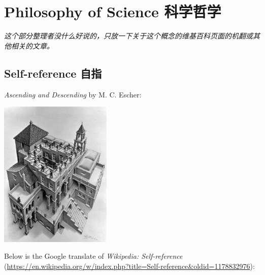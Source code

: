 \chapter{Philosophy of Science
科学哲学}\label{philosophy-of-science-ux79d1ux5b66ux54f2ux5b66}

\emph{这个部分整理者没什么好说的，只放一下关于这个概念的维基百科页面的机翻或其他相关的文章。}

\section{Self-reference 自指}\label{self-reference-ux81eaux6307}

\emph{Ascending and Descending} by M. C. Escher:

\begin{center}
\includegraphics[height=200pt]{../assets/Ascending_and_Descending.jpg}
\end{center}

Below is the Google translate of \textit{Wikipedia: Self-reference} (\url{https://en.wikipedia.org/w/index.php?title=Self-reference&oldid=1178832976}):

